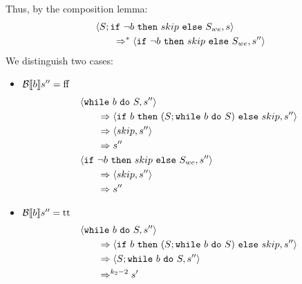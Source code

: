 \begin{exercise}
\begin{enumerate}
\begin{itemize}
\begin{itemize}
\begin{itemize}
                                    Thus, by the composition lemma:
                                    \begin{align*}
                                        &\left<S; \texttt{if}\ \neg b\ \texttt{then}\ skip\ \texttt{else}\ S_{we}, s\right>
                                        \\&\qquad\Rightarrow^* \left<\texttt{if}\ \neg b\ \texttt{then}\ skip\ \texttt{else}\ S_{we}, s''\right>
                                    \end{align*}
                                    We distinguish two cases:
                                    \begin{itemize}
                                        \item $\mathcal{B} \llbracket b \rrbracket s'' = \text{ff}$
                                            \begin{align*}
                                                &\left<\texttt{while}\ b\ \texttt{do}\ S, s''\right>
                                                \\&\qquad\Rightarrow \left<\texttt{if}\ b\ \texttt{then}\ (S; \texttt{while}\ b\ \texttt{do}\ S)\ \texttt{else}\ skip, s''\right>
                                                \\&\qquad\Rightarrow \left<skip, s''\right>
                                                \\&\qquad\Rightarrow s''
                                                \\
                                                &\left<\texttt{if}\ \neg b\ \texttt{then}\ skip\ \texttt{else}\ S_{we}, s''\right>
                                                \\&\qquad\Rightarrow \left<skip, s''\right>
                                                \\&\qquad\Rightarrow s''
                                            \end{align*}
                                        \item $\mathcal{B} \llbracket b \rrbracket s'' = \text{tt}$
                                            \begin{align*}
                                                &\instr{\wwhile{b}{S}}{s''}
                                                \\&\qquad\Rightarrow \instr{\wif{b}{(S; \wwhile{b}{S})}{skip}}{s''}
                                                \\&\qquad\Rightarrow \instr{S; \wwhile{b}{S}}{s''}
                                                \\&\qquad\Rightarrow^{k_2-2} s'
                                                \\

\end{align*}
\end{itemize}
\end{itemize}
\end{itemize}
\end{itemize}
\end{enumerate}
\end{exercise}
